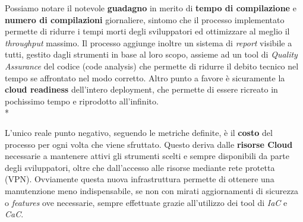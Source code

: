 \documentclass[../main.tex]{subfiles}
\begin{document}
	    Possiamo notare il notevole \textbf{guadagno} in merito di \textbf{tempo di compilazione} e \textbf{numero di compilazioni} giornaliere, sintomo che il processo implementato permette di ridurre i tempi morti degli sviluppatori ed ottimizzare al meglio il \emph{throughput} massimo. Il processo aggiunge inoltre un sistema di \emph{report} visibile a tutti, gestito dagli strumenti in base al loro scopo, assieme ad un tool di \emph{Quality Assurance} del codice (code analysis) che permette di ridurre il debito tecnico nel tempo se affrontato nel modo corretto. Altro punto a favore è sicuramente la \textbf{cloud readiness} dell'intero deployment, che permette di essere ricreato in pochissimo tempo e riprodotto all'infinito.\\*
	    
	    L'unico reale punto negativo, seguendo le metriche definite, è il \textbf{costo} del processo per ogni volta che viene sfruttato. Questo deriva dalle \textbf{risorse Cloud} necessarie a mantenere attivi gli strumenti scelti e sempre disponibili da parte degli sviluppatori, oltre che dall'accesso alle risorse mediante rete protetta (VPN). Ovviamente questa nuova infrastruttura permette di ottenere una manutenzione meno indispensabile, se non con mirati aggiornamenti di sicurezza o \emph{features} ove necessarie, sempre effettuate grazie all'utilizzo dei tool di \emph{IaC} e \emph{CaC}.
\end{document}
